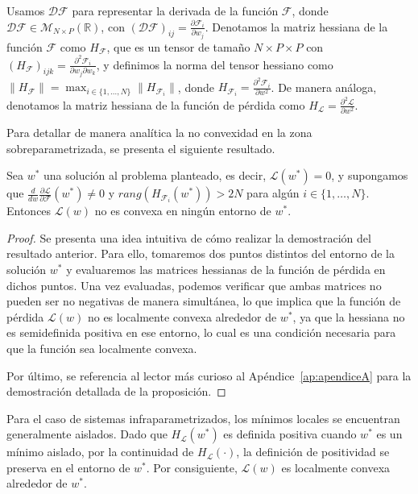 Usamos $\mathcal{DF}$ para representar la derivada de la función $\mathcal{F}$, donde $\mathcal{DF} \in \mathcal{M}_{N \times P}(\mathbb{R})$, con $(\mathcal{DF})_{ij} = \frac{\partial \mathcal{F}_{i}}{\partial w_j}$. Denotamos la matriz hessiana de la función $\mathcal{F}$ como $H_{\mathcal{F}}$, que es un tensor de tamaño $N \times P \times P$ con $(H_{\mathcal{F}})_{ijk} = \frac{\partial^2 \mathcal{F}_{i}}{\partial w_j \partial w_k}$, y definimos la norma del tensor hessiano como $\| H_{\mathcal{F}} \| = \max_{i \in \{1, \ldots,N \}} \| H_{\mathcal{F}_{i}} \|$, donde $H_{\mathcal{F}_{i}} = \frac{\partial^2 \mathcal{F}_{i}}{\partial w^2}$. De manera análoga, denotamos la matriz hessiana de la función de pérdida como $H_{\mathcal{L}} = \frac{\partial^2 \mathcal{L}}{\partial w^2}$.

Para detallar de manera analítica la no convexidad en la zona sobreparametrizada, se presenta el siguiente resultado.

\begin{proposicion}\label{prop:non-conexity}
    Sea $w^{*}$ una solución al problema planteado, es decir, $\mathcal{L}(w^{*}) = 0$, y supongamos que $\frac{d}{dw}\frac{\partial \mathcal{L}}{\partial \mathcal{F}}(w^{*}) \neq 0$ y $rang(H_{\mathcal{F}_{i}}(w^{*})) > 2N$ para algún $i \in \{1, \ldots, N \}$. Entonces $\mathcal{L}(w)$ no es convexa en ningún entorno de $w^{*}$.
\end{proposicion}

\begin{proof}
    Se presenta una idea intuitiva de cómo realizar la demostración del resultado anterior. Para ello, tomaremos dos puntos distintos del entorno de la solución $w^*$ y evaluaremos las matrices hessianas de la función de pérdida en dichos puntos. Una vez evaluadas, podemos verificar que ambas matrices no pueden ser no negativas de manera simultánea, lo que implica que la función de pérdida $\mathcal{L}(w)$ no es localmente convexa alrededor de $w^*$, ya que la hessiana no es semidefinida positiva en ese entorno, lo cual es una condición necesaria para que la función sea localmente convexa.

    Por último, se referencia al lector más curioso al Apéndice~\ref{ap:apendiceA} para la demostración detallada de la proposición.
\end{proof}

Para el caso de sistemas infraparametrizados, los mínimos locales se encuentran generalmente aislados. Dado que $H_{\mathcal{L}}(w^{*})$ es definida positiva cuando $w^{*}$ es un mínimo aislado, por la continuidad de $H_{\mathcal{L}}(\cdot)$, la definición de positividad se preserva en el entorno de $w^{*}$. Por consiguiente, $\mathcal{L}(w)$ es localmente convexa alrededor de $w^{*}$.

